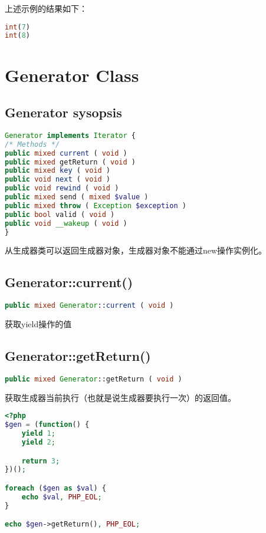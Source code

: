 上述示例的结果如下：

\begin{lstlisting}[language=PHP]
int(7)
int(8)
\end{lstlisting}






\chapter{Generator Class}

\section{Generator sysopsis}



\begin{lstlisting}[language=PHP]
Generator implements Iterator {
/* Methods */
public mixed current ( void )
public mixed getReturn ( void )
public mixed key ( void )
public void next ( void )
public void rewind ( void )
public mixed send ( mixed $value )
public mixed throw ( Exception $exception )
public bool valid ( void )
public void __wakeup ( void )
}
\end{lstlisting}

从生成器类可以返回生成器对象，生成器对象不能通过new操作实例化。

\section{Generator::current()}


\begin{lstlisting}[language=PHP]
public mixed Generator::current ( void )
\end{lstlisting}

获取yield操作的值

\section{Generator::getReturn()}




\begin{lstlisting}[language=PHP]
public mixed Generator::getReturn ( void )
\end{lstlisting}

获取生成器当前执行（也就是说生成器要执行一次）的返回值。

\begin{lstlisting}[language=PHP]
<?php
$gen = (function() {
    yield 1;
    yield 2;

    return 3;
})();

foreach ($gen as $val) {
    echo $val, PHP_EOL;
}

echo $gen->getReturn(), PHP_EOL;
\end{lstlisting}

